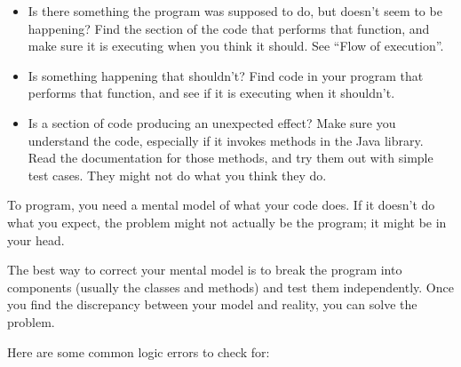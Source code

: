\documentclass[12pt]{book}
\theoremstyle{exercise}
\begin{document}
\begin{itemize}

\item Is there something the program was supposed to do, but doesn't seem to be happening?
Find the section of the code that performs that function, and make sure it is executing when you think it should.
See ``Flow of execution''.%

\item Is something happening that shouldn't?
Find code in your program that performs that function, and see if it is executing when it shouldn't.

\item Is a section of code producing an unexpected effect?
Make sure you understand the code, especially if it invokes methods in the Java library.
Read the documentation for those methods, and try them out with simple test cases.
They might not do what you think they do.

\end{itemize}

To program, you need a mental model of what your code does.
If it doesn't do what you expect, the problem might not actually be the program; it might be in your head.


The best way to correct your mental model is to break the program into components (usually the classes and methods) and test them independently.
Once you find the discrepancy between your model and reality, you can solve the problem.

Here are some common logic errors to check for:

\end{document}
